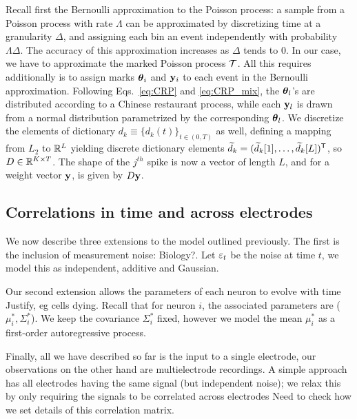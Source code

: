 Recall first the Bernoulli approximation to the Poisson process: a sample from a Poisson process with rate $\Lambda$ can be approximated by discretizing
time at a granularity $\Delta$, and assigning each bin an event independently with probability $\Lambda\Delta$. The accuracy of this approximation increases 
as $\Delta$ tends to $0$.
%
In our case, we have to approximate the marked Poisson process $\mathcal{T}$. All this requires additionally is to assign marks $\boldsymbol{\theta}_i$ and $\mathbf{y}_i$ to each event 
in the Bernoulli approximation. Following Eqs.~\eqref{eq:CRP} and \eqref{eq:CRP_mix}, the $\boldsymbol{\theta}_l$'s are distributed according
to a Chinese restaurant process, while each $\mathbf{y}_l$ is drawn from a normal distribution parametrized by the corresponding $\boldsymbol{\theta}_l$. We discretize the 
elements of dictionary $d_k \equiv \{d_k(t)\}_{t \in (0,T)}$ as well, defining a mapping from $L_2$ to $\mathbb{R}^L$ yielding discrete dictionary elements $\widetilde{d}_k=(\widetilde{d}_k[1], \ldots, \widetilde{d}_k[L])^{\mathsf{T}}$,  so  $D \in \mathbb{R}^{K \times T}$. The shape of the $j^{th}$ spike is now a vector of length $L$, and for a weight vector
$\mathbf{y}$, is given by $D \mathbf{y}$.

\subsection{Correlations in time and across electrodes}
We now describe three extensions to the model outlined previously. The first is the inclusion of measurement noise: 
{\color{red} Biology?}. Let $\varepsilon_t$ be the noise at time $t$, we model this as independent, additive and Gaussian.

Our second extension allows the parameters of each neuron to evolve with time {\color{red} Justify, eg cells dying}. Recall that for neuron $i$, the 
associated parameters are ($\mu^*_i, \Sigma^*_i$). We keep the covariance $\Sigma^*_i$ fixed, however we model the mean $\mu^*_i$ as a first-order
autoregressive process. 

Finally, all we have described so far is the input to a single electrode, our observations on the other hand are multielectrode recordings. 
A simple approach has all electrodes having the same signal (but independent noise); we relax this by only requiring the signals to be
correlated across electrodes {\color{red} Need to check how we set details of this correlation matrix}.
